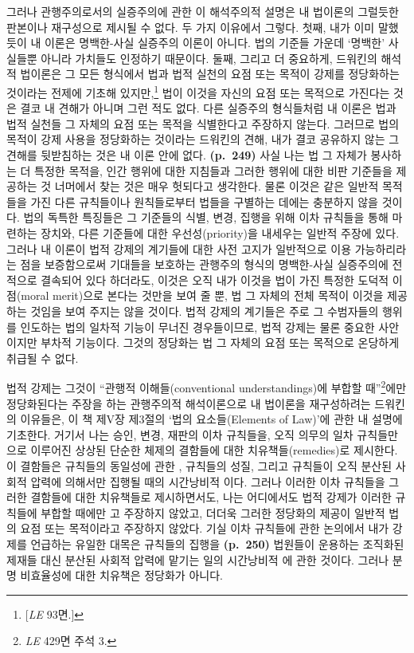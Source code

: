 그러나 관행주의로서의 실증주의에 관한 이 해석주의적 설명은 내 법이론의
그럴듯한 판본이나 재구성으로 제시될 수 없다. 두 가지 이유에서 그렇다.
첫째, 내가 이미 말했듯이 내 이론은 명백한-사실 실증주의 이론이 아니다.
법의 기준들 가운데 ‘명백한’ 사실들뿐 아니라 가치들도 인정하기 때문이다.
둘째, 그리고 더 중요하게, 드워킨의 해석적 법이론은 그 모든 형식에서 법과
법적 실천의 요점 또는 목적이 강제를 정당화하는 것이라는 전제에 기초해
있지만,\footnote{{[}\emph{LE} 93면.{]}} 법이 이것을 자신의 요점 또는
목적으로 가진다는 것은 결코 내 견해가 아니며 그런 적도 없다. 다른
실증주의 형식들처럼 내 이론은 법과 법적 실천들 그 자체의 요점 또는
목적을 식별한다고 주장하지 않는다. 그러므로 법의 목적이 강제 사용을
정당화하는 것이라는 드워킨의 견해, 내가 결코 공유하지 않는 그 견해를
뒷받침하는 것은 내 이론 안에 없다. \textbf{(p.~249)} 사실 나는 법 그
자체가 봉사하는 더 특정한 목적을, 인간 행위에 대한 지침들과 그러한
행위에 대한 비판 기준들을 제공하는 것 너머에서 찾는 것은 매우 헛되다고
생각한다. 물론 이것은 같은 일반적 목적들을 가진 다른 규칙들이나
원칙들로부터 법들을 구별하는 데에는 충분하지 않을 것이다. 법의 독특한
특징들은 그 기준들의 식별, 변경, 집행을 위해 이차 규칙들을 통해 마련하는
장치와, 다른 기준들에 대한 우선성(priority)을 내세우는 일반적 주장에
있다. 그러나 내 이론이 법적 강제의 계기들에 대한 사전 고지가 일반적으로
이용 가능하리라는 점을 보증함으로써 기대들을 보호하는 관행주의 형식의
명백한-사실 실증주의에 전적으로 결속되어 있다 하더라도, 이것은 오직 내가
이것을 법이 가진 특정한 도덕적 이점(moral merit)으로 본다는 것만을 보여
줄 뿐, 법 그 자체의 전체 목적이 이것을 제공하는 것임을 보여 주지는 않을
것이다. 법적 강제의 계기들은 주로 그 수범자들의 행위를 인도하는 법의
일차적 기능이 무너진 경우들이므로, 법적 강제는 물론 중요한 사안이지만
부차적 기능이다. 그것의 정당화는 법 그 자체의 요점 또는 목적으로
온당하게 취급될 수 없다.

법적 강제는 그것이 “관행적 이해들(conventional understandings)에 부합할
때”\footnote{\emph{LE} 429면 주석 3.}에만 정당화된다는 주장을 하는
관행주의적 해석이론으로 내 법이론을 재구성하려는 드워킨의 이유들은, 이
책 제V장 제3절의 ‘법의 요소들(Elements of Law)’에 관한 내 설명에
기초한다. 거기서 나는 승인, 변경, 재판의 이차 규칙들을, 오직 의무의 일차
규칙들만으로 이루어진 상상된 단순한 체제의 결함들에 대한
치유책들(remedies)로 제시한다. 이 결함들은 규칙들의 동일성에 관한
, 규칙들의  성질, 그리고 규칙들이 오직
분산된 사회적 압력에 의해서만 집행될 때의 시간낭비적
이다. 그러나 이러한 이차 규칙들을 그러한 결함들에 대한
치유책들로 제시하면서도, 나는 어디에서도 법적 강제가 이러한 규칙들에
부합할 때에만 고 주장하지 않았고, 더더욱 그러한
정당화의 제공이 일반적 법의 요점 또는 목적이라고 주장하지 않았다. 기실
이차 규칙들에 관한 논의에서 내가 강제를 언급하는 유일한 대목은 규칙들의
집행을 \textbf{(p.~250)} 법원들이 운용하는 조직화된 제재들 대신 분산된
사회적 압력에 맡기는 일의 시간낭비적 에 관한 것이다.
그러나 분명 비효율성에 대한 치유책은 정당화가 아니다.

